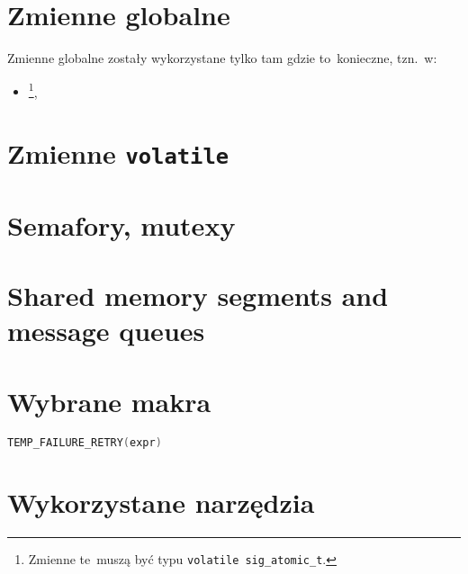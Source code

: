 \documentclass[thesis]{subfiles}
\begin{document}

\section{Zmienne globalne}
\noindent Zmienne globalne zostały wykorzystane tylko tam gdzie to~konieczne, tzn.~w:
\begin{itemize}
	\item {}\footnote{Zmienne te~muszą być typu \texttt{volatile sig\_atomic\_t}.},
\end{itemize}


\section{Zmienne \texttt{volatile}}


\section{Semafory, mutexy}


\section{Shared memory segments and message queues}


\section{Wybrane makra}

\begin{lstlisting}[language=c,numbers=none,caption={Makro wykonujące wyrażenie dopóki kod błędu jest równy \texttt{EINTR}}]
TEMP_FAILURE_RETRY(expr)
\end{lstlisting}


\section{Wykorzystane narzędzia}
\end{document}

